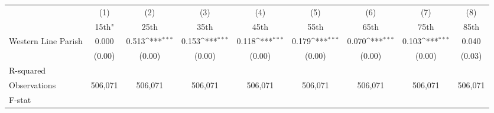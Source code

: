{
\def\sym#1{\ifmmode^{#1}\else\(^{#1}\)\fi}
\begin{tabular}{l*{8}{c}}
\hline\hline
                    &\multicolumn{1}{c}{(1)}&\multicolumn{1}{c}{(2)}&\multicolumn{1}{c}{(3)}&\multicolumn{1}{c}{(4)}&\multicolumn{1}{c}{(5)}&\multicolumn{1}{c}{(6)}&\multicolumn{1}{c}{(7)}&\multicolumn{1}{c}{(8)}\\
                    &\multicolumn{1}{c}{15th"}&\multicolumn{1}{c}{25th}&\multicolumn{1}{c}{35th}&\multicolumn{1}{c}{45th}&\multicolumn{1}{c}{55th}&\multicolumn{1}{c}{65th}&\multicolumn{1}{c}{75th}&\multicolumn{1}{c}{85th}\\
\hline
Western Line Parish &       0.000         &       0.513\sym{***}&       0.153\sym{***}&       0.118\sym{***}&       0.179\sym{***}&       0.070\sym{***}&       0.103\sym{***}&       0.040         \\
                    &      (0.00)         &      (0.00)         &      (0.00)         &      (0.00)         &      (0.00)         &      (0.00)         &      (0.00)         &      (0.03)         \\
\hline
R-squared           &                     &                     &                     &                     &                     &                     &                     &                     \\
Observations        &     506,071         &     506,071         &     506,071         &     506,071         &     506,071         &     506,071         &     506,071         &     506,071         \\
F-stat              &                     &                     &                     &                     &                     &                     &                     &                     \\
\hline\hline
\end{tabular}
}
